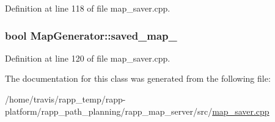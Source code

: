 Definition at line 118 of file map\-\_\-saver.\-cpp.

\hypertarget{classMapGenerator_ad899126ba6b03388bd076e1418ae7120}{
\subsubsection[{saved\-\_\-map\-\_\-}]{\setlength{\rightskip}{0pt plus 5cm}bool Map\-Generator\-::saved\-\_\-map\-\_\-}}\label{classMapGenerator_ad899126ba6b03388bd076e1418ae7120}


Definition at line 120 of file map\-\_\-saver.\-cpp.



The documentation for this class was generated from the following file\-:\begin{DoxyCompactItemize}
\item 
/home/travis/rapp\-\_\-temp/rapp-\/platform/rapp\-\_\-path\-\_\-planning/rapp\-\_\-map\-\_\-server/src/\hyperlink{map__saver_8cpp}{map\-\_\-saver.\-cpp}\end{DoxyCompactItemize}
